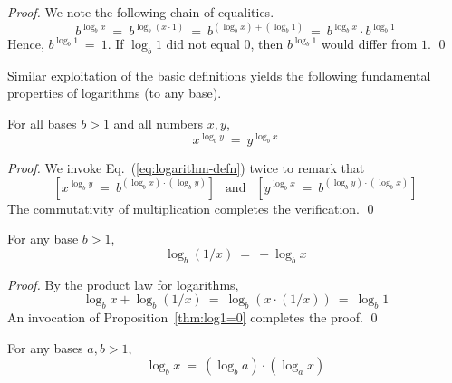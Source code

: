 \begin{proof}
We note the following chain of equalities.
\[  b^{\log_b x} \ = \ b^{\log_b (x \cdot 1)} 
  \ = \ b^{(\log_b x) + (\log_b 1)} 
  \ = \ b^{\log_b x} \cdot b^{\log_b 1}
\]
Hence, $b^{\log_b 1} \ = \ 1$.  If $\log_b 1$ did not equal $0$, then $b^{\log_b 1}$ would differ from $1$.  \qed
\end{proof}

Similar exploitation of the basic definitions yields the following fundamental properties of logarithms (to any base).

\begin{prop}
For all bases $b > 1$ and all numbers $x, y$,
\[ x^{\log_b y} \ = \ y^{\log_b x} \]
\end{prop}

\begin{proof}
We invoke Eq.~(\ref{eq:logarithm-defn}) twice to remark that
\[ \left[x^{\log_b y} \ = \ b^{(\log_b x) \cdot (\log_b y)}\right]
\ \ \mbox{ and } \ \ 
\left[y^{\log_b x}\ = \ b^{(\log_b y) \cdot (\log_b x)}\right] \]
The commutativity of multiplication completes the verification.  \qed
\end{proof}

\smallskip

\begin{prop}
For any base $b >1$,
\[ \log_b (1/x) \ = \ - \log_b x \]
\end{prop}

\begin{proof}
By the product law for logarithms,
\[ \log_b x + \log_b (1/x) \ = \ \log_b (x \cdot (1/x))
\  = \ \log_b 1
\]
An invocation of Proposition~\ref{thm:log1=0} completes the proof.  \qed
\end{proof}

\smallskip

\begin{prop}
For any bases $a, b >1$,
\begin{equation}
\label{eq:log-exp-0}
\log_b x \ = \ \left(\log_b a \right) \cdot \left( \log_a x \right)
\end{equation}
\end{prop}

